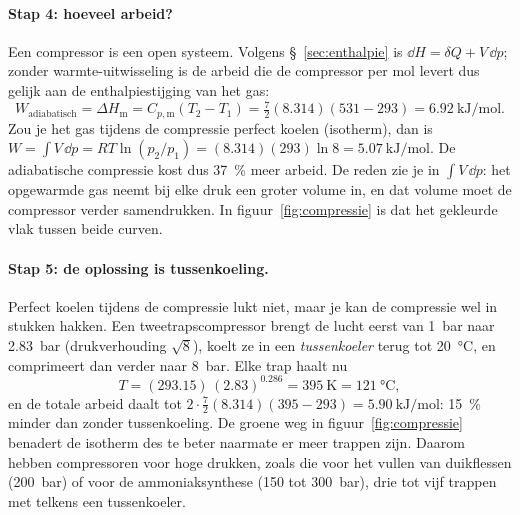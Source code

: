 \paragraph{Stap 4: hoeveel arbeid?}
Een compressor is een open systeem. Volgens \S~\ref{sec:enthalpie} is $\dd H = \delta Q + V\,\dd p$; zonder warmte-uitwisseling is de arbeid die de compressor per mol levert dus gelijk aan de enthalpiestijging van het gas:
\[
W_\text{adiabatisch} = \Delta H_\mathrm{m} = C_{p,\mathrm{m}}(T_2 - T_1) = \tfrac{7}{2}(8.314)(531 - 293) = \SI{6.92}{\kilo\joule\per\mole}.
\]
Zou je het gas tijdens de compressie perfect koelen (isotherm), dan is $W = \int V\,\dd p = RT\ln(p_2/p_1) = (8.314)(293)\ln 8 = \SI{5.07}{\kilo\joule\per\mole}$. De adiabatische compressie kost dus \SI{37}{\percent} meer arbeid. De reden zie je in $\int V\,\dd p$: het opgewarmde gas neemt bij elke druk een groter volume in, en dat volume moet de compressor verder samendrukken. In figuur~\ref{fig:compressie} is dat het gekleurde vlak tussen beide curven.

\paragraph{Stap 5: de oplossing is tussenkoeling.}
Perfect koelen tijdens de compressie lukt niet, maar je kan de compressie wel in stukken hakken. Een tweetrapscompressor brengt de lucht eerst van \SI{1}{\bar} naar \SI{2.83}{\bar} (drukverhouding $\sqrt{8}$), koelt ze in een \emph{tussenkoeler} terug tot \SI{20}{\celsius}, en comprimeert dan verder naar \SI{8}{\bar}. Elke trap haalt nu
\[
T = (293.15)\,(2.83)^{0.286} = \SI{395}{\kelvin} = \SI{121}{\celsius},
\]
en de totale arbeid daalt tot $2 \cdot \tfrac{7}{2}(8.314)(395 - 293) = \SI{5.90}{\kilo\joule\per\mole}$: \SI{15}{\percent} minder dan zonder tussenkoeling. De groene weg in figuur~\ref{fig:compressie} benadert de isotherm des te beter naarmate er meer trappen zijn. Daarom hebben compressoren voor hoge drukken, zoals die voor het vullen van duikflessen (\SI{200}{\bar}) of voor de ammoniaksynthese (150 tot \SI{300}{\bar}), drie tot vijf trappen met telkens een tussenkoeler.

